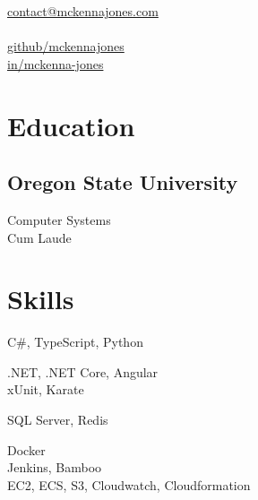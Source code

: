 \documentclass[]{hieudo-build}
\begin{document}
%
%
{
	\faEnvelope \href{mailto:contact@mckennajones.com}{ contact@mckennajones.com}\\
	 \\
	\faGithub \href{https://github.com/mckennajones}{   github/mckennajones}\\
	\faLinkedin \href{https://www.linkedin.com/in/mckenna-jones}{   in/mckenna-jones}}
    
%
%
\begin{minipage}[t]{0.25\textwidth} 

\section{Education} 

\subsection{Oregon State University}
Computer Systems \\
Cum Laude\\

\vspace{20pt}
\section{Skills}
C\#, TypeScript, Python
\sectionsep

.NET, .NET Core, Angular\\
xUnit, Karate
\sectionsep

SQL Server, Redis\\
\sectionsep

Docker\\
Jenkins, Bamboo\\
EC2, ECS, S3, Cloudwatch, Cloudformation
\sectionsep

%
%
\end{minipage} 
\end{document}
